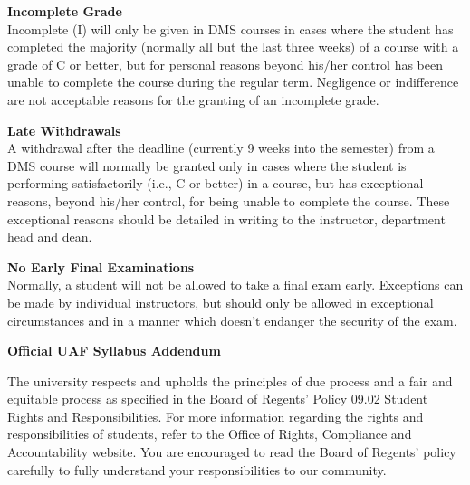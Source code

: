\documentclass[12pt]{article}
\renewcommand{\emph}[1]{\textsf{\textbf{#1}}}
\newcommand{\localhead}[1]{\par\smallskip\textbf{#1}\nobreak\\}%
\def\subheading#1{\localhead{\emph{#1}}}
\begin{document}
\subheading{Incomplete Grade} 
Incomplete (I) will only be given in
  DMS courses in cases where
  the student has completed the majority (normally all but the last
  three weeks) of a course with a grade of C or better, but for
  personal reasons beyond his/her control has been unable to complete
  the course during the regular term. Negligence or indifference are
  not acceptable reasons for the granting of an incomplete
  grade. 

\subheading{Late Withdrawals} 
A withdrawal after the deadline
  (currently 9 weeks into the semester) from a DMS course will
  normally be granted only in cases where the student is performing
  satisfactorily (i.e., C or better) in a course, but has exceptional
  reasons, beyond his/her control, for being unable to complete the
  course. These exceptional reasons should be detailed in writing to
  the instructor, department head and dean.

\subheading{No Early Final Examinations}
 Normally, a student will not be
  allowed to take a final exam early. Exceptions can be made by
  individual instructors, but should only be allowed in exceptional
  circumstances and in a manner which doesn't endanger the security of
  the exam.

\pagebreak

 



\begin{center}
\textbf{\large{Official UAF Syllabus Addendum}}
\end{center}


 The university respects and upholds the principles of due process and a fair and equitable process as specified in the Board of Regents' Policy 09.02 Student Rights and Responsibilities. For more information regarding the rights and responsibilities of students, refer to the Office of Rights, Compliance and Accountability website. You are encouraged to read the Board of Regents' policy carefully to fully understand your responsibilities to our community.
\end{document}
